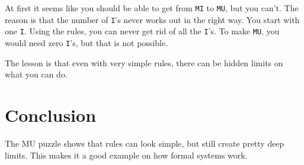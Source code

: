 \documentclass[12pt]{article}
\begin{document}
At first it seems like you should be able to get from \texttt{MI} to
\texttt{MU}, but you can't. The reason is that the number of
\texttt{I}'s never works out in the right way. You start with one \texttt{I}.
Using the rules, you can never get rid of all the \texttt{I}'s. To make
\texttt{MU}, you would need zero \texttt{I}'s, but that is not possible.  

The lesson is that even with very simple rules, there can be hidden limits on what you can do.

\section{Conclusion}
The MU puzzle shows that rules can look simple, but still create pretty deep limits.
This makes it a good example on how formal systems work.
\end{document}
